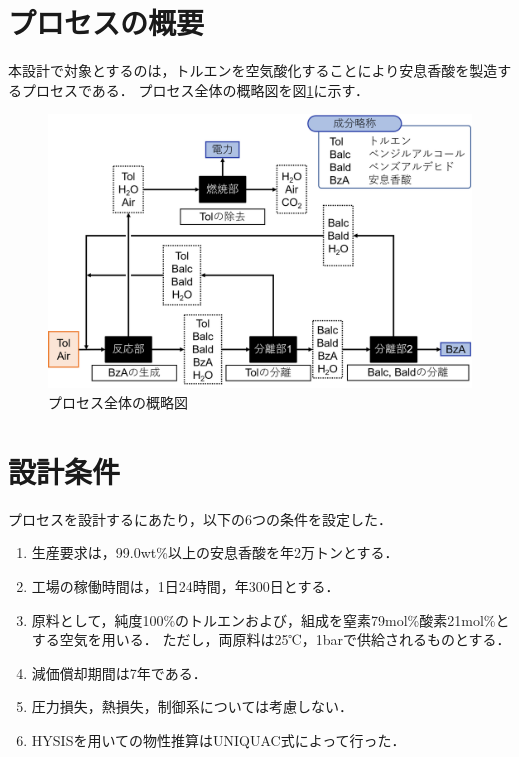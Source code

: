 \documentclass[a4j]{jsreport}
\begin{document}
\section{プロセスの概要}
本設計で対象とするのは，トルエンを空気酸化することにより安息香酸を製造するプロセスである．
プロセス全体の概略図を図\ref{プロセス全体のの概略図}に示す．
\begin{figure}[htbp]
    \label{プロセス全体のの概略図}
    \begin{center}
        \includegraphics[scale=0.5]{processOutline.png}
        \caption{プロセス全体の概略図}
    \end{center}
\end{figure}

\section{設計条件}
プロセスを設計するにあたり，以下の6つの条件を設定した．
\begin{enumerate}
    \item 生産要求は，99.0wt\%以上の安息香酸を年2万トンとする．\\
    \item 工場の稼働時間は，1日24時間，年300日とする．\\
    \item 原料として，純度100\%のトルエンおよび，組成を窒素79mol\%酸素21mol\%とする空気を用いる．
             ただし，両原料は25℃，1barで供給されるものとする．\\
    \item 減価償却期間は7年である．\\
    \item 圧力損失，熱損失，制御系については考慮しない．\\
    \item HYSISを用いての物性推算はUNIQUAC式によって行った．
\end{enumerate}
\end{document}
